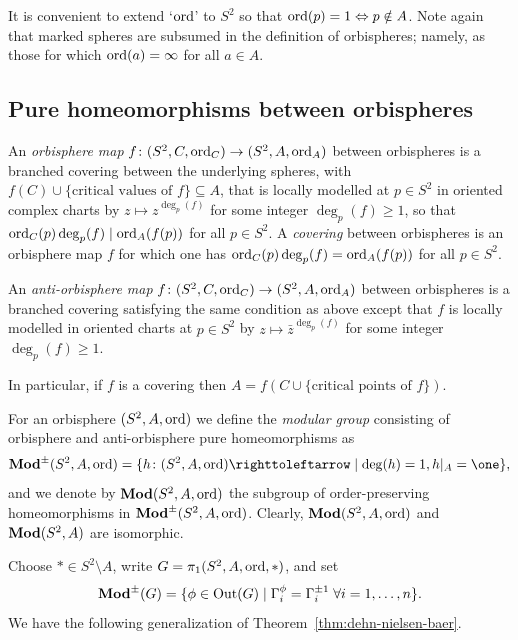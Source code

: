 \documentclass{amsart}
\begin{document}
It is convenient to extend `$\operatorname{ord}$' to $S^2$ so that
$\operatorname{ord}(p)=1\Leftrightarrow p\notin A$.  Note again that marked spheres
are subsumed in the definition of orbispheres; namely, as those for
which $\operatorname{ord}(a)=\infty$ for all $a\in A$.

\subsection{Pure homeomorphisms between orbispheres}
\begin{defn}
  An \emph{orbisphere map} $f\colon(S^2,C,\operatorname{ord}_C)\to(S^2,A,\operatorname{ord}_A)$
  between orbispheres is a branched covering between the underlying
  spheres, with $f(C)\cup\{\text{critical values of }f\}\subseteq A$,
  that is locally modelled at $p\in S^2$ in oriented complex charts by
  $z\mapsto z^{\deg_p(f)}$ for some integer $\deg_p(f)\ge1$, so that
  $\operatorname{ord}_C(p)\deg_p(f)\mid\operatorname{ord}_A(f(p))$ for all $p\in S^2$. A
  \emph{covering} between orbispheres is an orbisphere map $f$ for
  which one has $\operatorname{ord}_C(p)\deg_p(f)=\operatorname{ord}_A(f(p))$ for all $p\in S^2$.
  
  An \emph{anti-orbisphere map}
  $f\colon(S^2,C,\operatorname{ord}_C)\to(S^2,A,\operatorname{ord}_A)$ between orbispheres is a
  branched covering satisfying the same condition as above except that
  $f$ is locally modelled in oriented charts at $p\in S^2$ by
  $z\mapsto {\bar z}^{\deg_p(f)}$ for some integer $\deg_p(f)\ge1$.
\end{defn}
In particular, if $f$ is a covering then
$A=f(C\cup\{\text{critical points of }f\})$.

For an orbisphere $(S^2,A,\operatorname{ord})$ we define the \emph{modular group}
consisting of orbisphere and anti-orbisphere pure homeomorphisms as
\[\Mod^{\pm}(S^2,A,\ord) =\{ h\colon (S^2,A,\ord)\selfmap\mid \deg(h)=1, h|_{A}=\one\},\]
and we denote by $\mathbf{\relax Mod}(S^2,A,\operatorname{ord})$ the subgroup of order-preserving
homeomorphisms in $\mathbf{\relax Mod}^{\pm}(S^2,A,\operatorname{ord})$.  Clearly,
$\mathbf{\relax Mod}(S^2,A,\operatorname{ord})$ and $ \mathbf{\relax Mod}(S^2,A)$ are isomorphic.

Choose $*\in S^2\setminus A$, write $G=\pi_1(S^2,A,\operatorname{ord},*)$, and set
\[\mathbf{\relax Mod}^{\pm}(G)=\{\phi\in\operatorname{Out}(G)\mid \Gamma_i^\phi=\Gamma^{\pm1 }_i\;\forall i=1,\dots,n\}.
\]
We have the following generalization of
Theorem~\ref{thm:dehn-nielsen-baer}.
\end{document}

